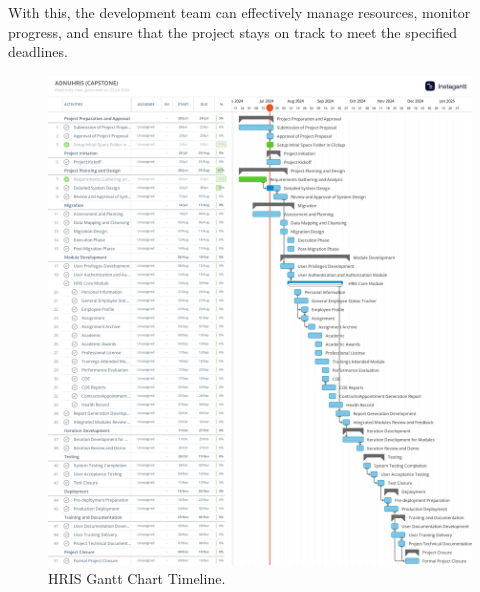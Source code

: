     With this, the development team can effectively manage resources, monitor progress, and ensure that the project stays on track to meet the specified deadlines.

    \begin{figure}[H]
        \centering
        \includegraphics[width=1\linewidth]{figures/images/gantt-chart.png}
        \caption{HRIS Gantt Chart Timeline.}
        \label{fig:gantt-chart}
    \end{figure}




